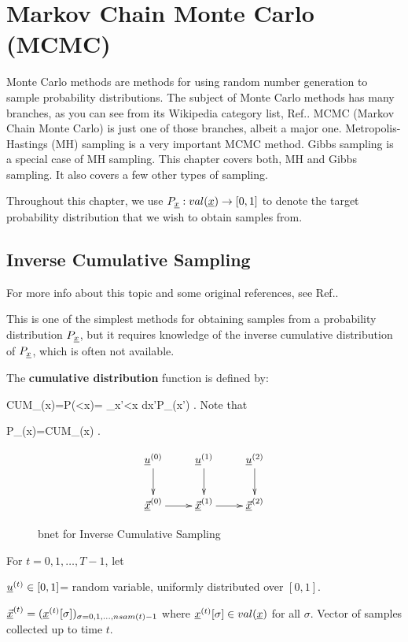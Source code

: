 \chapter{Markov Chain Monte Carlo (MCMC)}
\label{ch-mcmc}


Monte Carlo methods
are methods for using
 random number generation to
sample probability distributions.
The subject of Monte Carlo methods
has many branches, as you can see 
from its Wikipedia
category list, Ref.\cite{wiki-monte-carlo}.
MCMC (Markov
Chain Monte Carlo) is just one of those
branches, albeit a major one.
Metropolis-Hastings (MH) sampling
is a very important MCMC method.
Gibbs sampling is
a special case
of MH sampling.
This chapter covers both, MH and Gibbs sampling.
It also covers a few 
other types of sampling.

Throughout this chapter,
we use $P_\rvx:val(\rvx)\rarrow [0,1]$
to denote the target probability
distribution
that we wish to obtain samples from.


\section{Inverse Cumulative Sampling}
For more info about this topic 
and some original references, 
see Ref.\cite{wiki-inv-cum}.

This
is one of the simplest
methods for obtaining
samples from a probability 
distribution $P_\rvx$,
but it
requires knowledge
of the inverse
 cumulative distribution
of $P_\rvx$, which
is often not available.

The {\bf cumulative
distribution} function
is defined by:

\beq
CUM_\rvx(x)=P(\rvx<x)=
\int_{x'<x} dx'\;P_\rvx(x')
\;.
\eeq
Note that

\beq
P_\rvx(x)=CUM_\rvx(x)
\;.
\eeq


\begin{figure}[h!]
$$\xymatrix{
\rvu^{(0)}\ar[d]
&\rvu^{(1)}\ar[d]
&\rvu^{(2)}\ar[d]
\\
\ul{\vecx}^{(0)}\ar[r]
&\ul{\vecx}^{(1)}\ar[r]
&\ul{\vecx}^{(2)}
}$$
\caption{bnet for Inverse Cumulative Sampling}
\label{fig-mcmc-inverse-bnet}
\end{figure}

For $t=0, 1, \ldots, T-1$, let

$\rvu^{(t)}\in [0,1]$= random variable, 
uniformly
distributed over $[0,1]$.

$\ul{\vecx}^{(t)}=(\rvx^{(t)}[\sigma])_{\sigma=0,1, 
\ldots, nsam(t)-1}$
where $\rvx^{(t)}[\sigma] \in val(\rvx)$ for all $\sigma$.
Vector of samples collected 
up to time $t$.

